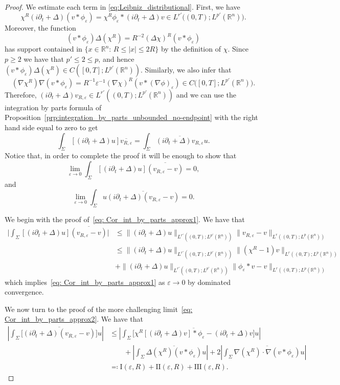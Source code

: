 \documentclass[10pt,a4paper]{amsart}
\newcommand{\R}{\mathbb{R}}
\def\d{\partial}
\def\ovl{\overline}
\def\ve{\varepsilon}
\begin{document}
\begin{proof}
We estimate each term in \eqref{eq:Leibniz_distributional}. First, we have
\[
\chi^R (i\d_t + \Delta)(v*\phi_\ve) = \chi^R \phi_\ve * (i\d_t + \Delta)v \in L^{r'}\big((0, T); L^{p'}(\R^n)\big).
\]
Moreover, the function
\[
( v*\phi_\ve ) \Delta(\chi^R) = R^{-2} (\Delta \chi)^R (v*\phi_\ve)
\]
has support contained in $\{x\in\R^n:\, R\leq |x|\leq 2R\}$ by the definition of $\chi$. Since $p\geq 2$ we have that $p'\leq 2 \leq p$, and hence $(v*\phi_\ve) \Delta (\chi^R)\in C([0, T]; L^{p'}(\R^n))$.  Similarly, we also infer that 
\[
( \nabla \chi^R ) \nabla (v*\phi_\ve) = R^{-1} \ve^{-1} (\nabla \chi)^R (v* (\nabla \phi)_\ve) \in C\big ([0, T]; L^{p'}(\R^n)\big). 
\]
Therefore, $(i \d_t + \Delta )v_{R, \ve} \in L^{r'}((0, T); L^{p'}(\R^n))$ and we can use the integration by parts formula of Proposition~\ref{prp:integration_by_parts_unbounded_no-endpoint} with the right hand side equal to zero to get 
\[
\int_\Sigma [(i\d_t + \Delta)u] \ovl{v_{R,\ve}} = \int_\Sigma \ovl{(i\d_t + \Delta) v_{R, \ve}}  u.
\]
Notice that, in order to complete the proof it will be enough to show that 
\begin{equation}\label{eq: Cor_int_by_parts_approx1}
\lim_{\ve \to 0} \int_\Sigma \left[(i\d_t + \Delta) u\right] \ovl{(v_{R, \ve} - v)} = 0, 
\end{equation}
and
\begin{equation}\label{eq: Cor_int_by_parts_approx2}
\lim_{\ve \to 0} \int_\Sigma u  \ovl{\left(i\d_t + \Delta\right)(v_{R, \ve} - v)} = 0.
\end{equation}

We begin with the proof of~\eqref{eq: Cor_int_by_parts_approx1}. We have that 
\begin{align*}
\Big| \int_\Sigma  [(i\d_t + \Delta) u] \ovl{(v_{R, \ve} - v)} \Big| &\leq 
\| (i\d_t + \Delta)u \|_{L^{r'}((0, T); L^{p'}(\R^n))} \| v_{R, \ve} - v \|_{L^r((0, T); L^p(\R^n))} \\
&\leq \| (i\d_t + \Delta)u \|_{L^{r'}((0, T); L^{p'}(\R^n))} \| (\chi^R - 1) v\|_{L^r((0, T); L^p(\R^n))} \\
&+ \| (i\d_t + \Delta)u \|_{L^{r'}((0, T); L^{p'}(\R^n))} \| \phi_\ve * v - v \|_{L^r((0, T); L^p(\R^n))}
\end{align*}
which implies~\eqref{eq: Cor_int_by_parts_approx1} as $\ve \to 0$ by dominated convergence. 

We now turn to the proof of the more challenging limit~\eqref{eq: Cor_int_by_parts_approx2}. We have that 
\begin{equation}\label{eq: Cor_int_by_parts_approx2_split} 
\begin{split}
\left| \int_\Sigma \big[ \ovl{ (i\d_t + \Delta)(v_{R,\ve} -v) } \big] u \right| &\leq
\left| \int_\Sigma \big[ \ovl{ \chi^R [(i\d_t+\Delta)v]*\phi_\ve - (i\d_t+\Delta)v }\big] u \right| 
\\
&\qquad +\left| \int_\Sigma \overline{\Delta(\chi^R) (v*\phi_\ve)} u \right| 
+ 2 \left| \int_\Sigma \overline{\nabla (\chi^R) \cdot \nabla (v*\phi_\ve)} u \right|
\\
&\eqqcolon \mathrm{I}(\ve,R)+\mathrm{II}(\ve,R)+\mathrm{III}(\ve,R).
\end{split}  
\end{equation}


\end{proof}
\end{document}
